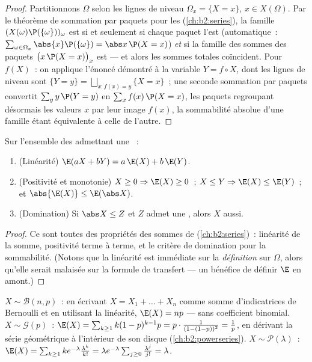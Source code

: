 \begin{proof}
Partitionnons $\Omega$ selon les lignes de niveau $\Omega_x = \{X = x\}$, $x
\in X(\Omega)$. Par le théorème de sommation par paquets pour les
 (\cref{ch:b2:series}), la famille
$(X(\omega)\P(\{\omega\}))_\omega$ est  si et seulement si chaque paquet l'est
(automatique~: $\sum_{\omega \in \Omega_x}\abs{x}\P(\{\omega\}) =
\abs x\,\P(X = x)$) \emph{et} si la famille des sommes des paquets
$\bigl(x\,\P(X = x)\bigr)_x$ est  --- et alors les sommes
totales coïncident. Pour $f(X)$~: on applique l'énoncé démontré à la variable $Y =
f \circ X$, dont les lignes de niveau sont $\{Y = y\} =
\bigsqcup_{x : f(x) = y}\{X = x\}$~; une seconde sommation par
paquets convertit $\sum_y y\,\P(Y = y)$ en $\sum_x
f(x)\,\P(X = x)$, les paquets regroupant désormais les valeurs $x$
par leur image $f(x)$, la sommabilité absolue d'une famille étant
équivalente à celle de l'autre.
\end{proof}

\begin{theorem}\label{thm:b2:randomvar:linearity}
Sur l'ensemble des  admettant une ~:
\begin{enumerate}
\item (Linéarité) $\E(aX + bY) = a\,\E(X) + b\,\E(Y)$.
\item (Positivité et monotonie) $X \geq 0 \Rightarrow \E(X)
\geq 0$~; $X \leq Y \Rightarrow \E(X) \leq \E(Y)$~; et
$\abs{\E(X)} \leq \E(\abs X)$.
\item (Domination) Si $\abs X \leq Z$ et $Z$ admet une ,
alors $X$ aussi.
\end{enumerate}
\end{theorem}

\begin{proof}
Ce sont toutes des propriétés des sommes de 
(\cref{ch:b2:series})~: linéarité de la somme, positivité terme à
terme, et le critère de domination pour la sommabilité. (Notons que
la linéarité est immédiate sur la \emph{définition} sur $\Omega$,
alors qu'elle serait malaisée sur la formule de transfert --- un
bénéfice de définir $\E$ en amont.)
\end{proof}

\begin{example}\label{ex:b2:randomvar:expectations}
$X \sim \mathcal{B}(n, p)$~: en écrivant $X = X_1 + \dots + X_n$ comme
somme d'indicatrices de Bernoulli et en utilisant la linéarité, $\E(X) = np$ ---
sans coefficient binomial. $X \sim \mathcal{G}(p)$~: $\E(X) =
\sum_{k\geq1}k(1-p)^{k-1}p = p\cdot\frac{1}{(1 - (1-p))^2} =
\frac1p$, en dérivant la série géométrique à l'intérieur de son disque
(\cref{ch:b2:powerseries}). $X \sim \mathcal{P}(\lambda)$~: $\E(X)
= \sum_{k\geq1}k e^{-\lambda}\frac{\lambda^k}{k!} = \lambda
e^{-\lambda}\sum_{j\geq0}\frac{\lambda^j}{j!} = \lambda$.
\end{example}

